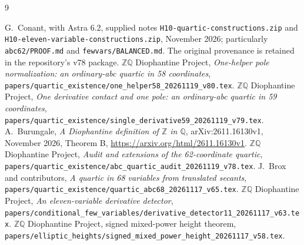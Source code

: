 \documentclass[11pt,a4paper]{article}
\newcommand{\Q}{\mathbb Q}\newcommand{\Z}{\mathbb Z}
\begin{document}
\begin{thebibliography}{9}\footnotesize\raggedright
\setlength{\itemsep}{1pt}
 G.~Conant, with Astra 6.2,
supplied notes \texttt{H10-quartic-constructions.zip} and
\texttt{H10-eleven-variable-constructions.zip}, November 2026;
particularly \texttt{abc62/PROOF.md} and \texttt{fewvars/BALANCED.md}.
The original provenance is retained in the repository's v78 package.
 \(\Z\Q\) Diophantine Project,
\emph{One-helper pole normalization: an ordinary-abc quartic in 58 coordinates},
\nolinkurl{papers/quartic_existence/one_helper58_20261119_v80.tex}.
 \(\Z\Q\) Diophantine Project,
\emph{One derivative contact and one pole: an ordinary-abc quartic in 59 coordinates},
\nolinkurl{papers/quartic_existence/single_derivative59_20261119_v79.tex}.
 A.~Burungale,
\emph{A Diophantine definition of $\Z$ in $\Q$},
arXiv:2611.16130v1, November 2026, Theorem B,
\url{https://arxiv.org/html/2611.16130v1}.
 \(\Z\Q\) Diophantine Project,
\emph{Audit and extensions of the 62-coordinate quartic},
\nolinkurl{papers/quartic_existence/abc_quartic_audit_20261119_v78.tex}.
 J.~Brox and contributors,
\emph{A quartic in 68 variables from translated secants},
\nolinkurl{papers/quartic_existence/quartic_abc68_20261117_v65.tex}.
 \(\Z\Q\) Diophantine Project,
\emph{An eleven-variable derivative detector},
\nolinkurl{papers/conditional_few_variables/derivative_detector11_20261117_v63.tex}.
 \(\Z\Q\) Diophantine Project, signed mixed-power height theorem,
\nolinkurl{papers/elliptic_heights/signed_mixed_power_height_20261117_v58.tex}.
\end{thebibliography}
\end{document}
